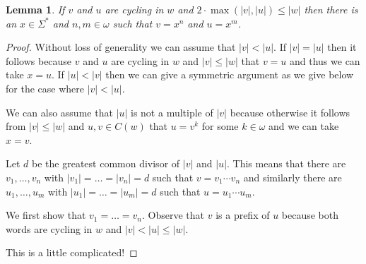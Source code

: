 \documentclass[a4paper]{article}
\newtheorem{lemma}[theorem]{Lemma}
\begin{document}
\begin{lemma}
 If $v$ and $u$ are cycling in $w$ and $2 \cdot \max(|v|,|u|) \leq |w|$
then there is an $x \in \Sigma^*$ and $n,m \in \omega$ such that $v =
x^n$ and $u = x^m$.
\end{lemma}
\begin{proof}
Without loss of generality we can assume that $|v| < |u|$. If $|v| =
|u|$ then it follows because $v$ and $u$ are cycling  in $w$ and $|v|
\leq |w|$ that $v = u$ and thus we can take $x = u$. If $|u| < |v|$ then
we can give a symmetric argument as we give below for the case where
$|v| < |u|$.

 We can also assume that $|u|$ is not a multiple of $|v|$ because
otherwise it follows from $|v| \leq |w|$ and $u,v \in C(w)$ that $u =
v^k$ for some $k \in \omega$ and we can take $x = v$.

Let $d$ be the greatest common divisor of $|v|$ and $|u|$. This means
that there are $v_1,\dots,v_n$ with $|v_1| = \dots = |v_n| = d$ such
that $v = v_1 \cdots v_n$ and similarly there are $u_1,\dots,u_m$ with
$|u_1| = \dots = |u_m| = d$ such that $u = u_1 \cdots u_m$.

We first show that $v_1 = \dots = v_n$.
Observe that $v$ is a prefix of $u$ because both words are cycling
in $w$ and $|v| < |u| \leq |w|$.

This is a little complicated!
\end{proof}
\end{document}
